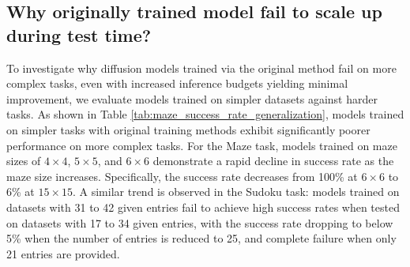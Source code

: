 \subsection{Why originally trained model fail to scale up during test time?}
\label{sec:failure_analysis}

\begin{table*}[h!]
\caption{\emph{Performance-energy consistency} of random search on Maze with grid size 15 and Sudoku harder dataset to test the effect of LRNCL loss. Here, $L=N$. Details of consistency calculation can be found in Appendix \ref{app:related_algo_metric}. }
\label{tab:diffus_baseline_consistency}
\vskip 0.05in
\begin{center}
\end{center}
\vskip -0.23in
\end{table*}
To investigate why diffusion models trained via the original method fail on more complex tasks, even with increased inference budgets yielding minimal improvement, we evaluate models trained on simpler datasets against harder tasks. As shown in Table \ref{tab:maze_success_rate_generalization}, models trained on simpler tasks with original training methods exhibit significantly poorer performance on more complex tasks. For the Maze task, models trained on maze sizes of $4 \times 4$, $5 \times 5$, and $6 \times 6$ demonstrate a rapid decline in success rate as the maze size increases. Specifically, the success rate decreases from 100\% at $6 \times 6$ to 6\% at $15 \times 15$. A similar trend is observed in the Sudoku task: models trained on datasets with 31 to 42 given entries fail to achieve high success rates when tested on datasets with 17 to 34 given entries, with the success rate dropping to below 5\% when the number of entries is reduced to 25, and complete failure when only 21 entries are provided.


